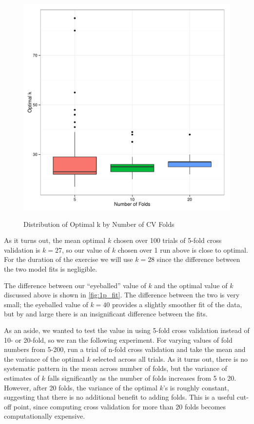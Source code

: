 \documentclass[11pt, fleqn]{article}
\begin{document}
\begin{figure}[!htb]
  \centering
  \caption{Distribution of Optimal k by Number of CV Folds}
  \includegraphics[scale=.5]{nfolds_k_dist.pdf}
  \label{fig:nfolds_k_dist}
\end{figure}

As it turns out, the mean optimal $k$ chosen over 100 trials of 5-fold cross validation is $k=27$, so our value of $k$ chosen over 1 run above is close to optimal. For the duration of the exercise we will use $k=28$ since the difference between the two model fits is negligible.

The difference between our ``eyeballed'' value of $k$ and the optimal value of $k$ discussed above is shown in \cref{fig:1p_fit}. The difference between the two is very small; the eyeballed value of $k=40$ provides a slightly smoother fit of the data, but by and large there is an insignificant difference between the fits.

As an aside, we wanted to test the value in using 5-fold cross validation instead of 10- or 20-fold, so we ran the following experiment. For varying values of fold numbers from 5-200, run a trial of n-fold cross validation and take the mean and the variance of the optimal $k$ selected across all trials. As it turns out, there is no systematic pattern in the mean across number of folds, but the variance of estimates of $k$ falls significantly as the number of folds increases from 5 to 20. However, after 20 folds, the variance of the optimal $k$'s is roughly constant, suggesting that there is no additional benefit to adding folds. This is a useful cut-off point, since computing cross validation for more than 20 folds becomes computationally expensive.
\end{document}
